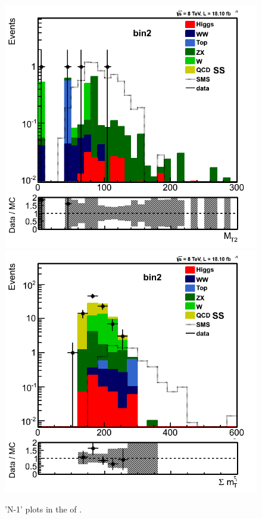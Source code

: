 \begin{figure}[!Hhtb]
\includegraphics[angle=0,scale=0.35]{TauTauFigs/MT2_bin2_14nov.png} 
\includegraphics[angle=0,scale=0.35]{TauTauFigs/summt_bin2_15nov.png}
\caption{'N-1' plots in the \bintwo of \tauTau.}
\label{fig:bin2}
\end{figure}



